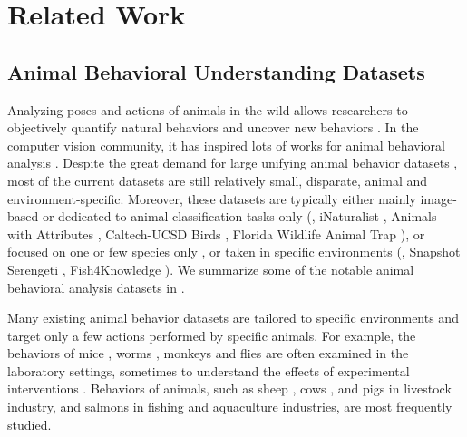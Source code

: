 \documentclass[10pt,twocolumn,letterpaper]{article}
\begin{document}
    
    \section{Related Work}
    \subsection{Animal Behavioral Understanding Datasets}
    
    Analyzing poses and actions of animals in the wild allows researchers to objectively quantify natural behaviors \cite{graving2019deepposekit, ANDERSON201418, von2021big, MATHIS20201, pereira2019fast, robinson2014comparison} and uncover new behaviors \cite{von2021big, ANDERSON201418}. In the computer vision community, it has inspired lots of works for animal behavioral analysis \cite{liwildlife, ani11020485, rahman2014fast, maaloy2019spatio, liu2020computer, yang2018feeding, yu2021apk, cao2019cross, mu2020learning, li2020deformation, gupta2021dftnet, beyan2013detection, wang2020anomalous, rashid2017interspecies}. Despite the great demand for large unifying animal behavior datasets \cite{beery2021iwildcam, von2021big, ANDERSON201418}, most of the current datasets are still relatively small, disparate, animal and environment-specific. Moreover, these datasets are typically either mainly image-based or dedicated to animal classification tasks only (\eg, iNaturalist \cite{van2018inaturalist}, Animals with Attributes \cite{xian2020zeroshot}, Caltech-UCSD Birds \cite{WelinderEtal2010}, Florida Wildlife Animal Trap \cite{gagne2021florida}), or focused on one or few species only \cite{labuguen2021macaquepose, mathis2021pretraining, fang2021pose, WelinderEtal2010, neverova2021discovering}, or taken in specific environments (\eg, Snapshot Serengeti \cite{swanson2015snapshot}, Fish4Knowledge \cite{fish4knowledge}). We summarize some of the notable animal behavioral analysis datasets in . 
    
    
    Many existing animal behavior datasets are tailored to specific environments and target only a few actions performed by specific animals. For example, the behaviors of mice \cite{VANDAM2020108536, geuther2021action}, worms \cite{javer2018open}, monkeys \cite{bala2020automated} and flies \cite{ravbar2019automatic, graving2019deepposekit} are often examined in the laboratory settings, sometimes to understand the effects of experimental interventions \cite{crispim2017my}. Behaviors of animals, such as sheep \cite{owoeye2018online}, cows \cite{liang2018benchmark}, and pigs \cite{liu2020computer} in livestock industry, and salmons \cite{maaloy2019spatio} in fishing and aquaculture industries, are most frequently studied. 
    
\end{document}
